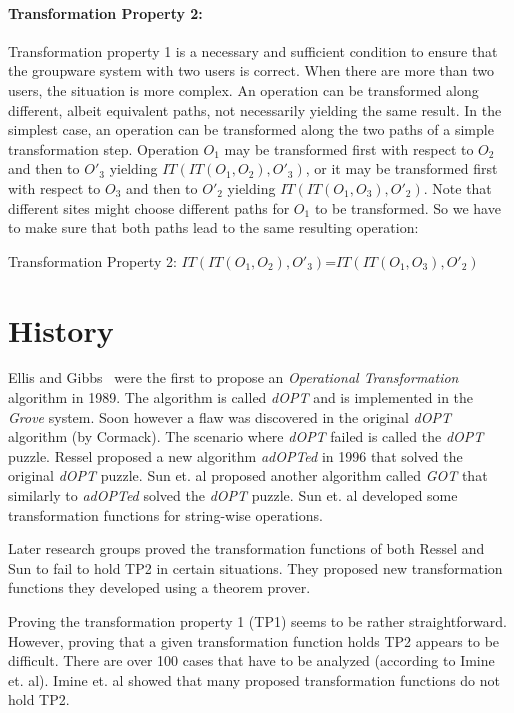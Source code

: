\documentclass[11pt,a4paper]{article}
\begin{document}
\paragraph{Transformation Property 2:}
Transformation property 1 is a necessary and sufficient condition to ensure that the groupware system with two users is correct. When there are more than two users, the situation is more complex. An operation can be transformed along different, albeit equivalent paths, not necessarily yielding the same result. In the simplest case, an operation can be transformed along the two paths of a simple transformation step. Operation $O_{1}$ may be transformed first with respect to $O_{2}$ and then to $O'_{3}$ yielding $IT(IT(O_{1},O_{2}),O'_{3})$, or it may be transformed first with respect to $O_{3}$ and then to $O'_{2}$ yielding $IT(IT(O_{1},O_{3}),O'_{2})$. Note that different sites might choose different paths for $O_{1}$ to be transformed. So we have to make sure that both paths lead to the same resulting operation:

\begin{defn}
Transformation Property 2: 
$IT(IT(O_{1},O_{2}),O'_{3})$=$IT(IT(O_{1},O_{3}),O'_{2})$
\end{defn}


\section{History}
{Ellis and Gibbs}~\cite{ellis} were the first to propose an \emph{Operational Transformation} algorithm in 1989. The algorithm is called \emph{dOPT} and is implemented in the \emph{Grove} system. Soon however a flaw was discovered in the original \emph{dOPT} algorithm (by Cormack\cite{cormack95a}). The scenario where \emph{dOPT} failed is called the \emph{dOPT} puzzle. Ressel\cite{ressel96} proposed a new algorithm \emph{adOPTed} in 1996 that solved the original \emph{dOPT} puzzle. {Sun et. al}\cite{sun98a} proposed another algorithm called \emph{GOT} that similarly to \emph{adOPTed} solved the \emph{dOPT} puzzle. {Sun et. al}\cite{sun98b} developed some transformation functions for string-wise operations.

Later research groups\cite{imine03}\cite{imine04} proved the transformation functions of both Ressel\cite{ressel96} and Sun\cite{sun98a} to fail to hold TP2 in certain situations. They proposed new transformation functions they developed using a theorem prover. 

Proving the transformation property 1 (TP1) seems to be rather straightforward. However, proving that a given transformation function holds TP2 appears to be difficult. There are over 100 cases that have to be analyzed (according to {Imine et. al}\cite{imine04}). Imine et. al showed that many proposed transformation functions do not hold TP2. 
\end{document}
